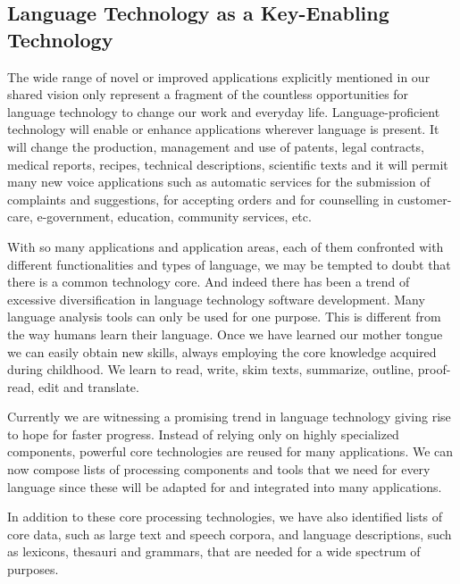\documentclass[10pt, plain]{../../metanetpaper}
\begin{document}
\begin{multicols}{2}
\subsection{Language Technology as a Key-Enabling Technology }
\label{sec:lang-techn-as-key-enabling-technology}

The wide range of novel or improved applications explicitly mentioned in our shared vision only represent a fragment of the countless opportunities for language technology to change our work and everyday life. Language-proficient technology will enable or enhance applications wherever language is present. It will change the production, management and use of patents, legal contracts, medical reports, recipes, technical descriptions, scientific texts and it will permit many new voice applications such as automatic services for the submission of complaints and suggestions, for accepting orders and for counselling in customer-care, e-government, education, community services, etc.   

With so many applications and application areas, each of them confronted with different functionalities and types of language, we may be tempted to doubt that there is a common technology core. And indeed there has been a trend of excessive diversification in language technology software development. Many language analysis tools can only be used for one purpose. This is different from the way humans learn their language. Once we have learned our mother tongue we can easily obtain new skills, always employing the core knowledge acquired during childhood. We learn to read, write, skim texts, summarize, outline, proof-read, edit and translate.
 
Currently we are witnessing a promising trend in language technology giving rise to hope for faster progress. Instead of relying only on highly specialized components, powerful core technologies are reused for many applications. We can now compose lists of processing components and tools that we need for every language since these will be adapted for and integrated into many applications.
 
In addition to these core processing technologies, we have also identified lists of core data, such as large text and speech corpora, and language descriptions, such as lexicons, thesauri and grammars, that are needed for a wide spectrum of purposes.
 

\end{multicols}
\end{document}

